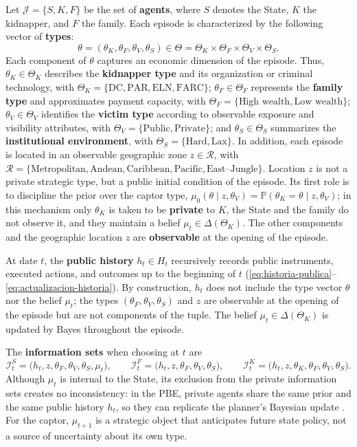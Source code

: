 \documentclass[12pt,a4paper]{article}
\providecommand{\textcite}{\citet}
\theoremstyle{plain}
\theoremstyle{definition}
\theoremstyle{remark}
\newcommand{\ProbE}{\mathbb{P}}
\newcommand{\1}{\mathbf{1}}
\begin{document}
Let $\mathcal{J}=\{S,K,F\}$ be the set of \textbf{agents}, where $S$ denotes the State,
$K$ the kidnapper, and $F$ the family. Each episode is characterized by the following
vector of \textbf{types}:
\[
\theta=(\theta_K,\theta_F,\theta_V,\theta_S)\in\Theta
=\Theta_K\times\Theta_F\times\Theta_V\times\Theta_S.
\]
Each component of $\theta$ captures an economic dimension of the episode. Thus,
$\theta_K\in\Theta_K$ describes the \textbf{kidnapper type} and its organization or
criminal technology, with
$\Theta_K=\{\text{DC},\text{PAR},\text{ELN},\text{FARC}\}$; $\theta_F\in\Theta_F$
represents the \textbf{family type} and approximates payment capacity, with
$\Theta_F=\{\text{High wealth},\text{Low wealth}\}$; $\theta_V\in\Theta_V$ identifies
the \textbf{victim type} according to observable exposure and visibility attributes,
with $\Theta_V=\{\text{Public},\text{Private}\}$; and $\theta_S\in\Theta_S$ summarizes
the \textbf{institutional environment}, with $\Theta_S=\{\text{Hard},\text{Lax}\}$.
In addition, each episode is located in an observable geographic zone
$z\in\mathcal{R}$, with
$\mathcal{R}=\{\text{Metropolitan},\text{Andean},\text{Caribbean},\text{Pacific},
\text{East--Jungle}\}$. Location $z$ is not a private strategic type, but a public
initial condition of the episode. Its first role is to discipline the prior over the
captor type,
$\mu_0(\theta\mid z,\theta_V)=\ProbE(\theta_K=\theta\mid z,\theta_V)$; in this
mechanism only $\theta_K$ is taken to be \textbf{private} to $K$, the State and the
family do not observe it, and they maintain a belief
$\mu_t\in\Delta(\Theta_K)$. The other components and the geographic location $z$ are
\textbf{observable} at the opening of the episode.

At date $t$, the \textbf{public history} $h_t\in H_t$ recursively records public
instruments, executed actions, and outcomes up to the beginning of $t$
\textup{(}\eqref{eq:historia-publica}--\eqref{eq:actualizacion-historia}\textup{)}.
By construction, $h_t$ does not include the type vector $\theta$ nor the belief
$\mu_t$; the types $(\theta_F,\theta_V,\theta_S)$ and $z$ are observable at the opening
of the episode but are not components of the tuple. The belief
$\mu_t\in\Delta(\Theta_K)$ is updated by Bayes throughout the episode.

The \textbf{information sets} when choosing at $t$ are
\[
\mathcal{I}_t^S = \bigl(h_t, z, \theta_F, \theta_V, \theta_S, \mu_t\bigr),
\qquad
\mathcal{I}_t^F = \bigl(h_t, z, \theta_F, \theta_V, \theta_S\bigr),
\qquad
\mathcal{I}_t^K = \bigl(h_t, z, \theta_K, \theta_F, \theta_V, \theta_S\bigr).
\]
Although $\mu_t$ is internal to the State, its exclusion from the private information
sets creates no inconsistency: in the PBE, private agents share the same prior and the
same public history $h_t$, so they can replicate the planner's Bayesian update
\textcite{FudenbergTirole1991}. For the captor, $\mu_{t+1}$ is a strategic object that
anticipates future state policy, not a source of uncertainty about its own type.
\end{document}
